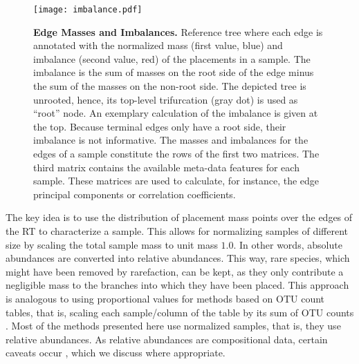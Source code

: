 \begin{figure}[!ht]
    \centering
    \texttt{[image: imbalance.pdf]}
    \begin{subfigure}{0pt}
        \label{fig:imbalance:sub:ReferenceTree}
    \end{subfigure}
    \begin{subfigure}{0pt}
        \label{fig:imbalance:sub:Matrices}
    \end{subfigure}
    \caption[Edge Masses and Imbalances]{
        \textbf{Edge Masses and Imbalances.}
        Reference tree where each edge is annotated with the normalized mass (first value, blue) and
        imbalance (second value, red) of the placements in a sample.
        The imbalance is the sum of masses on the root side of the edge minus the sum of the masses on the non-root side.
        The depicted tree is unrooted, hence, its top-level trifurcation (gray dot) is used as ``root'' node.
        An exemplary calculation of the imbalance is given at the top.
        Because terminal edges only have a root side, their imbalance is not informative.
        The masses and imbalances for the edges of a sample constitute the rows of the first two matrices.
        The third matrix contains the available meta-data features for each sample.
        These matrices are used to calculate, for instance, the edge principal components or correlation coefficients.
    }
    \label{fig:imbalance}
\end{figure}

The key idea is to use the distribution of placement mass points over the edges of the \ac{RT} to characterize a sample.
This allows for normalizing samples of different size
by scaling the total sample mass to unit mass $1.0$.
In other words, absolute abundances are converted into relative abundances.
This way, rare species, which might have been removed by rarefaction, can be kept,
as they only contribute a negligible mass to the branches into which they have been placed.
This approach is analogous to using proportional values for methods based on OTU count tables,
that is, scaling each sample/column of the table by its sum of OTU counts \cite{Weiss2017}.
Most of the methods presented here use normalized samples, that is, they use relative abundances.
As relative abundances are compositional data, certain caveats occur \cite{Aitchison1986,Lovell2015,Gloor2016},
which we discuss where appropriate.

